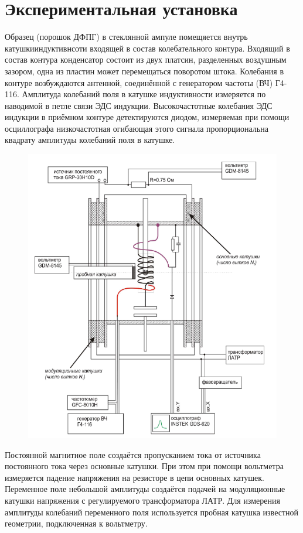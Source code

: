 \documentclass[a4paper, 12pt]{article}
\begin{document}
\newpage


\section {Экспериментальная установка}

    Образец (порошок ДФПГ) в стеклянной ампуле помещяется внутрь катушкииндуктивнсоти входящей в состав колебательного контура. Входящий в состав контура конденсатор состоит из двух платсин, разделенных воздушным зазором, одна из пластин может перемещаться поворотом штока. Колебания в контуре возбуждаются антенной, соединённой с генератором частоты (ВЧ) Г4-116. Амплитуда колебаний поля в катушке индуктивности измеряется по наводимой в петле связи ЭДС индукции. Высокочастотные колебания ЭДС индукции в приёмном контуре детектируются диодом, измеряемая при помощи осциллографа низкочастотная огибающая этого сигнала пропорциональна квадрату амплитуды колебаний поля в катушке.
    \begin{figure}[H]
        \centering
        \includegraphics[width=0.7\linewidth]{res/1.png}
    \end{figure}
	
	Постоянной магнитное поле создаётся пропусканием тока от источника постоянного тока через основные катушки. При этом при помощи вольтметра измеряется падение напряжения на резисторе в цепи основных катушек. Переменное поле небольшой амплитуды создаётся подачей на модуляционные катушки напряжения с регулируемого трансформатора ЛАТР. Для измерения амплитуды колебаний переменного поля используется пробная катушка известной геометрии, подключенная к вольтметру.
	
\end{document}
